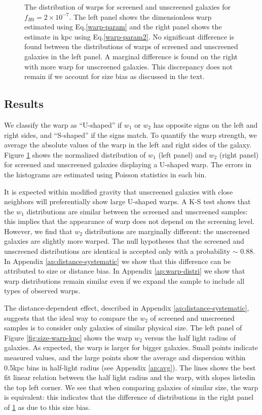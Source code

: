 \documentclass{emulateapj}
\begin{document}
\begin{figure}
\begin{center}
\caption{ The distribution of warps for screened and unscreened galaxies for
$f_{R0} = 2\times10^{-7}$.
The left panel shows the dimensionless warp estimated using 
Eq.\ref{warp-param} and the  right panel shows the estimate in kpc using   
  Eq.\ref{warp-param2}. No significant difference is found
between the distributions of warps of  screened and unscreened galaxies in 
the left panel. A marginal difference is found on the right with more warp
for unscreened galaxies. This discrepancy does not remain if we account for size
bias as discussed in the text.}
\label{fig:warp-distr}
\end{center}
\end{figure}

\subsection{Results}
We classify the warp as ``U-shaped'' if $w_1$ or $w_2$ has opposite signs on
the left
and right sides, and ``S-shaped'' if the signs match.
To quantify the warp strength, we average the absolute values of the
warp in the left and right sides of the galaxy.
Figure \ref{fig:warp-distr} shows the normalized distribution of $w_1$ 
(left panel) and $w_2$ (right panel) 
for screened and unscreened galaxies displaying a
U-shaped warp. The errors in the histograms are estimated using Poisson
statistics in each bin.

It is expected within modified gravity that unscreened galaxies with
close neighbors will preferentially show large U-shaped warps.
A K-S test shows that the $w_1$ distributions are similar between the
screened and unscreened samples: this implies that the appearance of
warp does not depend on the screening level.
However, we find that $w_2$ distributions are
marginally different: the unscreened galaxies are slightly more warped. The
null hypotheses that the screened and unscreened distributions are identical is
accepted only with a probability $\sim$ 0.88.
In Appendix \ref{ap:distance-systematic} we show that this difference can be
attributed to size or
distance bias. In Appendix \ref{ap:warp-distri} we show that
warp distributions remain similar even if we expand the sample to include
all types of observed warps.

The distance-dependent effect, described in Appendix
\ref{ap:distance-systematic}, suggests that the ideal way to
compare the $w_2$ of screened and unscreened samples is to consider
only galaxies of similar physical size.
The left panel of Figure \ref{fig:size-warp-kpc} shows the
warp $w_2$ versus the half light radius of galaxies. As expected, the
warp is larger for bigger galaxies. Small points indicate measured
values, and the large points show the average and dispersion within
0.5kpc bins in half-light radius (see Appendix \ref{ap:avg}).
The lines shows the best fit linear relation between the
half light radius and the warp, with slopes listedin the top left corner.
We see that when comparing galaxies of similar size, the warp is
equivalent: this indicates that the difference of distributions in the
right panel of \ref{fig:warp-distr} as due to this size bias. 
\end{document}
